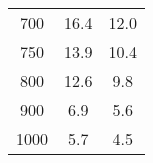 \begin{table}
\begin{center}
\begin{tabular}{|c|c|c|}
     700 &                16.4 &                12.0 \\
     750 &                13.9 &                10.4 \\
     800 &                12.6 &                 9.8 \\
     900 &                 6.9 &                 5.6 \\
    1000 &                 5.7 &                 4.5 \\
\hline
\end{tabular}
\end{center}
\end{table}















